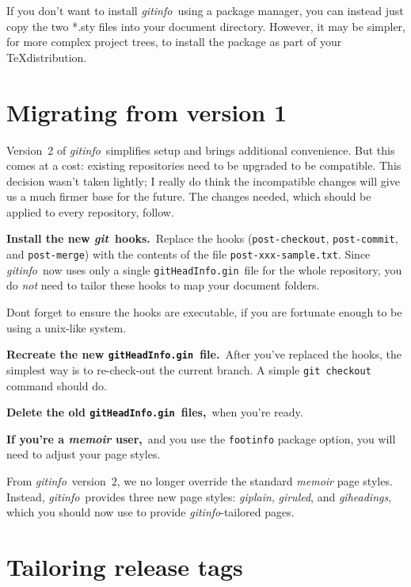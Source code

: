 \documentclass[a4paper,12pt,twoside,openany]{memoir}
\newcommand{\bpara}[1]{\par\vspace{\beforeparaskip}\noindent\textbf{#1}\,}
\newcommand{\sfit}[1]{\textit{#1}}
\newcommand{\git}{\sfit{git}}
\newcommand{\tpname}{\sfit{gitinfo}}
\newcommand{\ginname}{gitHeadInfo.gin}
\newcommand{\metaname}{\texttt{\ginname}}
\begin{document}
If you don't want to install \tpname\ using a package manager,
you can instead just copy the two *.sty files into your document directory.
However, it may be simpler, for more complex project trees,
to install the package as part of your \TeX distribution.

\section{Migrating from version 1}

Version~2 of \tpname\ simplifies setup and brings additional convenience.
But this comes at a cost:
existing repositories need to be upgraded to be compatible.
This decision wasn't taken lightly; I really do think the incompatible changes
will give us a much firmer base for the future.
The changes needed, which should be applied to every repository, follow.

\bpara{Install the new \git\ hooks.}
Replace the hooks (\texttt{post-checkout}, \texttt{post-commit},
and \texttt{post-merge}) with the contents of the file \texttt{post-xxx-sample.txt}.
Since \tpname\ now uses only a single \metaname\ file for the whole repository,
you do \emph{not} need to tailor these hooks to map your document folders.

Dont forget to ensure the hooks are executable,
if you are fortunate enough to be using a unix-like system.

\bpara{Recreate the new \metaname\ file.}
After you've replaced the hooks, the simplest way is to re-check-out the current branch.
A simple \verb!git checkout! command should do.

\bpara{Delete the old \metaname\ files,}
when you're ready.

\bpara{If you're a \sfit{memoir} user,}
and you use the \texttt{footinfo} package option,
you will need to adjust your page styles.

From \tpname\ version~2, we no longer override the standard \sfit{memoir}
page styles.
Instead, \tpname\ provides three new page styles:
\sfit{giplain}, \sfit{giruled}, and \sfit{giheadings},
which you should now use to provide \tpname-tailored pages.

\section{Tailoring release tags}
\end{document}
